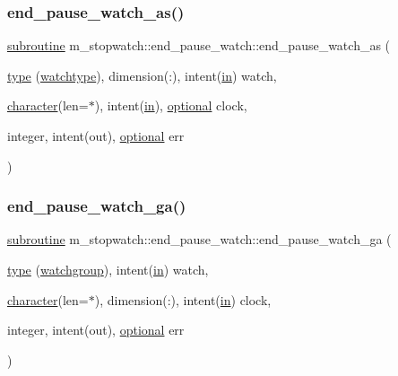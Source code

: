\subsubsection{\texorpdfstring{end\+\_\+pause\+\_\+watch\+\_\+as()}{end\_pause\_watch\_as()}}
{\footnotesize\ttfamily \hyperlink{M__stopwatch_83_8txt_acfbcff50169d691ff02d4a123ed70482}{subroutine} m\+\_\+stopwatch\+::end\+\_\+pause\+\_\+watch\+::end\+\_\+pause\+\_\+watch\+\_\+as (\begin{DoxyParamCaption}\item[{\hyperlink{stop__watch_83_8txt_a70f0ead91c32e25323c03265aa302c1c}{type} (\hyperlink{structm__stopwatch_1_1watchtype}{watchtype}), dimension(\+:), intent(\hyperlink{M__journal_83_8txt_afce72651d1eed785a2132bee863b2f38}{in})}]{watch,  }\item[{\hyperlink{option__stopwatch_83_8txt_abd4b21fbbd175834027b5224bfe97e66}{character}(len=$\ast$), intent(\hyperlink{M__journal_83_8txt_afce72651d1eed785a2132bee863b2f38}{in}), \hyperlink{option__stopwatch_83_8txt_aa4ece75e7acf58a4843f70fe18c3ade5}{optional}}]{clock,  }\item[{integer, intent(out), \hyperlink{option__stopwatch_83_8txt_aa4ece75e7acf58a4843f70fe18c3ade5}{optional}}]{err }\end{DoxyParamCaption})\hspace{0.3cm}{\ttfamily [private]}}

\mbox{\label{interfacem__stopwatch_1_1end__pause__watch_a92e6ba93cc87135a10d395b5ee3dfecf}} 
\subsubsection{\texorpdfstring{end\+\_\+pause\+\_\+watch\+\_\+ga()}{end\_pause\_watch\_ga()}}
{\footnotesize\ttfamily \hyperlink{M__stopwatch_83_8txt_acfbcff50169d691ff02d4a123ed70482}{subroutine} m\+\_\+stopwatch\+::end\+\_\+pause\+\_\+watch\+::end\+\_\+pause\+\_\+watch\+\_\+ga (\begin{DoxyParamCaption}\item[{\hyperlink{stop__watch_83_8txt_a70f0ead91c32e25323c03265aa302c1c}{type} (\hyperlink{structm__stopwatch_1_1watchgroup}{watchgroup}), intent(\hyperlink{M__journal_83_8txt_afce72651d1eed785a2132bee863b2f38}{in})}]{watch,  }\item[{\hyperlink{option__stopwatch_83_8txt_abd4b21fbbd175834027b5224bfe97e66}{character}(len=$\ast$), dimension(\+:), intent(\hyperlink{M__journal_83_8txt_afce72651d1eed785a2132bee863b2f38}{in})}]{clock,  }\item[{integer, intent(out), \hyperlink{option__stopwatch_83_8txt_aa4ece75e7acf58a4843f70fe18c3ade5}{optional}}]{err }\end{DoxyParamCaption})\hspace{0.3cm}{\ttfamily [private]}}

